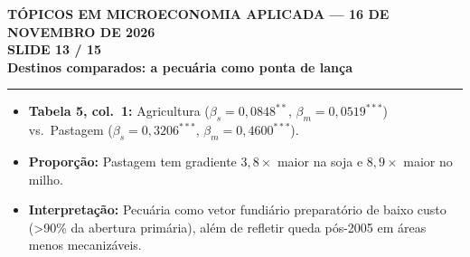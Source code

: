 \documentclass[11pt,a4paper]{article}
\newcommand{\slidenum}{1}
\begin{document}
\newpage

\renewcommand{\slidenum}{13}
\noindent
\begin{minipage}{\textwidth}
\begin{center}
{\color{cinza}\footnotesize\textbf{TÓPICOS EM MICROECONOMIA APLICADA --- 16 DE NOVEMBRO DE 2026}\\[1.2mm]}
{\color{cinza}\bfseries\Large SLIDE 13 / 15\\[1.5mm]}
{\color{verde}\bfseries\LARGE Destinos comparados: a pecuária como ponta de lança\\[2.5mm]}
\rule{\textwidth}{1pt}
\end{center}
\end{minipage}
\vspace{1.5mm}

\begin{tcolorbox}[title={\bfseries\small ÂNCORAS EMPÍRICAS E CONCEITUAIS DO SLIDE}]
\begin{itemize}[leftmargin=*,itemsep=1mm,topsep=0.5mm]
    \item \textbf{Tabela 5, col.\ 1:} Agricultura ($\beta_s = 0{,}0848^{**}$, $\beta_m = 0{,}0519^{***}$) vs.\ Pastagem ($\beta_s = 0{,}3206^{***}$, $\beta_m = 0{,}4600^{***}$).
    \item \textbf{Proporção:} Pastagem tem gradiente $3{,}8\times$ maior na soja e $8{,}9\times$ maior no milho.
    \item \textbf{Interpretação:} Pecuária como vetor fundiário preparatório de baixo custo (>90\% da abertura primária), além de refletir queda pós-2005 em áreas menos mecanizáveis.
\end{itemize}
\end{tcolorbox}
\vspace{2mm}
\end{document}
